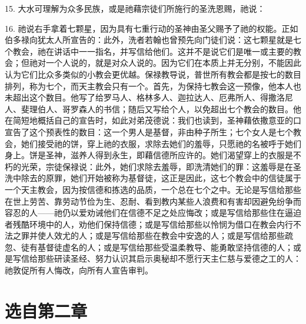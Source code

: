15. 大水可理解为众多民族，或是祂藉宗徒们所施行的圣洗恩赐，祂说：\par

16. 祂说右手拿着七颗星，因为具有七重行动的圣神由圣父赐予了祂的权能。正如伯多禄向犹太人所宣告的：此外，洗者若翰也曾预先向门徒们说：这七颗星就是七个教会，祂在讲话中一一指名，并写信给他们。这并不是说它们是唯一或主要的教会；但祂对一个人说的，就是对众人说的。因为它们在本质上并无分别，不能因此认为它们比众多类似的小教会更优越。保禄教导说，普世所有教会都是按七的数目排列，称为七个，而天主教会只有一个。首先，为保持七教会这一预像，他本人也未超出这个数目。他写了给罗马人、格林多人、迦拉达人、厄弗所人、得撒洛尼人、斐理伯人、哥罗森人的书信；随后又写给个人，以免超出七个教会的数目。他在简短地概括自己的宣告时，如此对弟茂德说：我们也读到，圣神藉依撒意亚的口宣告了这个预表性的数目：这一个男人是基督，非由种子所生；七个女人是七个教会，她们接受祂的饼，穿上祂的衣服，求除去她们的羞辱，只愿祂的名被呼于她们身上。饼是圣神，滋养人得到永生，即藉信德所应许的。她们渴望穿上的衣服是不朽的光荣，宗徒保禄说：此外，她们求除去羞辱，即洗清她们的罪：这羞辱是在圣洗中除去的原罪，她们开始被称为基督徒，这正是因此，这七个教会中的信徒属于一个天主教会，因为按信德和拣选的品质，一个总在七个之中。无论是写信给那些在世上劳苦、靠劳动节俭为生、忍耐、看到教内某些人浪费和有害却因避免纷争而容忍的人——祂仍以爱劝诫他们在信德不足之处应悔改；或是写信给那些住在逼迫者残酷环境中的人，劝他们保持信德；或是写信给那些以怜悯为借口在教会内行不法之罪并使人效尤的人；或是写信给那些在教会中安逸的人；或是写信给那些疏忽、徒有基督徒虚名的人；或是写信给那些受温柔教导、能勇敢坚持信德的人；或是写信给那些研读圣经、努力认识其启示奥秘却不愿行天主仁慈与爱德之工的人：祂敦促所有人悔改，向所有人宣告审判。\par


\section{选自第二章}

